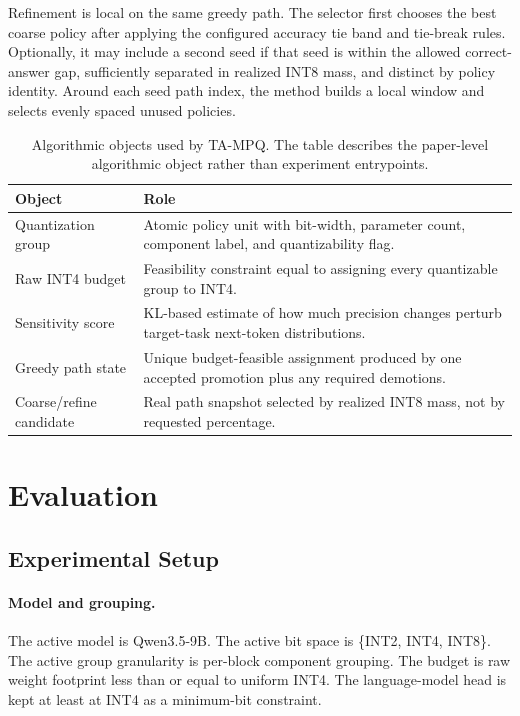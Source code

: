 \documentclass{article}
\newcommand{\method}{TA-MPQ}
\newcommand{\inttwo}{INT2}
\newcommand{\intfour}{INT4}
\newcommand{\inteight}{INT8}
\begin{document}
Refinement is local on the same greedy path. The selector first chooses the best coarse policy after applying the configured accuracy tie band and tie-break rules. Optionally, it may include a second seed if that seed is within the allowed correct-answer gap, sufficiently separated in realized \inteight{} mass, and distinct by policy identity. Around each seed path index, the method builds a local window and selects evenly spaced unused policies.

\begin{table}[t]
\caption{Algorithmic objects used by \method{}. The table describes the paper-level algorithmic object rather than experiment entrypoints.}
\label{tab:algorithmic-objects}
\centering
\begin{tabular}{p{}p{}}
\toprule
Object & Role \\
\midrule
Quantization group & Atomic policy unit with bit-width, parameter count, component label, and quantizability flag. \\
Raw \intfour{} budget & Feasibility constraint equal to assigning every quantizable group to \intfour{}. \\
Sensitivity score & KL-based estimate of how much precision changes perturb target-task next-token distributions. \\
Greedy path state & Unique budget-feasible assignment produced by one accepted promotion plus any required demotions. \\
Coarse/refine candidate & Real path snapshot selected by realized \inteight{} mass, not by requested percentage. \\
\bottomrule
\end{tabular}
\end{table}

\section{Evaluation}

\subsection{Experimental Setup}

\paragraph{Model and grouping.}
The active model is Qwen3.5-9B. The active bit space is \{\inttwo{}, \intfour{}, \inteight{}\}. The active group granularity is per-block component grouping. The budget is raw weight footprint less than or equal to uniform \intfour{}. The language-model head is kept at least at \intfour{} as a minimum-bit constraint.
\end{document}
